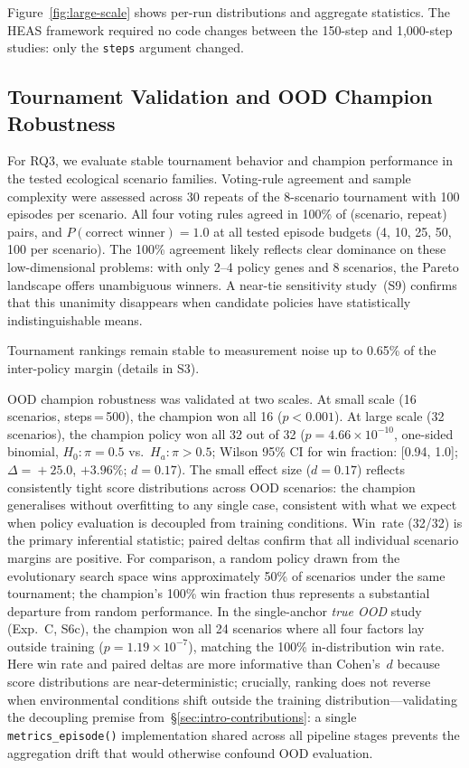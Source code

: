 \documentclass{wscpaperproc}
\begin{document}
Figure~\ref{fig:large-scale} shows per-run distributions and aggregate
statistics. The HEAS framework required no code changes between the 150-step
and 1,000-step studies: only the \texttt{steps} argument changed.

\subsection{Tournament Validation and OOD Champion Robustness}
\label{sec:tournament}

For RQ3, we evaluate stable tournament behavior and champion performance in the
tested ecological scenario families. Voting-rule agreement and sample complexity
were assessed across 30 repeats of
the 8-scenario tournament with 100 episodes per scenario. All four voting rules
agreed in 100\% of
(scenario, repeat) pairs, and $P(\text{correct winner})\!=\!1.0$ at all tested
episode budgets (4, 10, 25, 50, 100 per scenario). The 100\% agreement likely
reflects clear dominance on these low-dimensional problems: with only 2--4 policy
genes and 8 scenarios, the Pareto landscape offers unambiguous winners. A
near-tie sensitivity study~(S9) confirms that this unanimity disappears when
candidate policies have statistically indistinguishable means.

Tournament rankings remain stable to measurement noise up to 0.65\% of the inter-policy margin (details in S3).

OOD champion robustness was validated at two scales. At small scale (16
scenarios, steps\,=\,500), the champion won all 16 ($p\!<\!0.001$). At large
scale (32 scenarios), the champion policy
won all 32 out of 32 ($p\!=\!4.66\!\times\!10^{-10}$, one-sided binomial, $H_0\colon \pi\!=\!0.5$ vs.\ $H_a\colon \pi\!>\!0.5$;
Wilson 95\% CI for win fraction: [0.94, 1.0]; $\Delta\!=\!+25.0$, $+3.96\%$;
$d\!=\!0.17$). The small effect size ($d\!=\!0.17$) reflects consistently tight score distributions across OOD scenarios: the champion generalises without overfitting to any single case, consistent with what we expect when policy evaluation is decoupled from training conditions. Win~rate (32/32) is the primary inferential statistic; paired deltas confirm that all individual scenario margins are positive. For comparison, a random policy drawn from the evolutionary search space wins approximately 50\% of scenarios under the same tournament; the champion's 100\% win fraction thus represents a substantial departure from random performance. In the single-anchor \emph{true OOD} study (Exp.~C, S6c), the
champion won all 24 scenarios where all four factors lay outside training
($p\!=\!1.19\!\times\!10^{-7}$), matching the 100\% in-distribution win rate.
Here win rate and paired deltas are more informative than Cohen's~$d$ because score distributions are near-deterministic; crucially, ranking does not reverse when environmental conditions shift outside the training distribution---validating the decoupling premise from~\S\ref{sec:intro-contributions}: a single \texttt{metrics\_episode()} implementation shared across all pipeline stages prevents the aggregation drift that would otherwise confound OOD evaluation.
\end{document}
